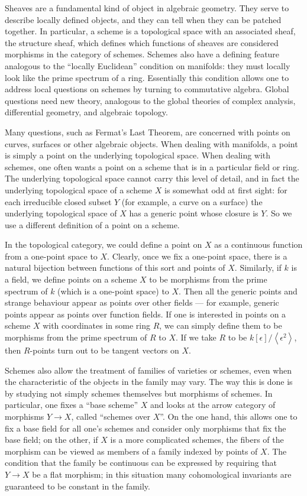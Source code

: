 \documentclass[12pt]{article}
\begin{document}
Sheaves are a fundamental kind of object in algebraic geometry.  They serve to describe locally defined objects, and they can tell when they can be patched together.  In particular, a scheme is a topological space with an associated sheaf, the structure sheaf, which defines which functions of sheaves are considered morphisms in the category of schemes.  Schemes also have a defining feature analogous to the ``locally Euclidean'' condition on manifolds: they must locally look like the prime spectrum of a ring.  Essentially this condition allows one to address local questions on schemes by turning to commutative algebra.  Global questions need new theory, analogous to the global theories of complex analysis, differential geometry, and algebraic topology.

Many questions, such as Fermat's Last Theorem, are concerned with points on curves, surfaces or other algebraic objects.  When dealing with manifolds, a point is simply a point on the underlying topological space.  When dealing with schemes, one often wants a point on a scheme that is in a particular field or ring.  The underlying topological space cannot carry this level of detail, and in fact the underlying topological space of a scheme $X$ is somewhat odd at first sight: for each irreducible closed subset $Y$ (for example, a curve on a surface) the underlying topological space of $X$ has a generic point whose closure is $Y$.  So we use a different definition of a point on a scheme.  

In the topological category, we could define a point on $X$ as a continuous function from a one-point space to $X$.  Clearly, once we fix a one-point space, there is a natural bijection between functions of this sort and points of $X$.  Similarly, if $k$ is a field, we define points on a scheme $X$ to be morphisms from the prime spectrum of $k$ (which is a one-point space) to $X$.  Then all the generic points and strange behaviour appear as points over other fields --- for example, generic points appear as points over function fields.  If one is interested in points on a scheme $X$ with coordinates in some ring $R$, we can simply define them to be morphisms from the prime spectrum of $R$ to $X$.  If we take $R$ to be $k[\epsilon]/\left<\epsilon^2\right>$, then $R$-points turn out to be tangent vectors on $X$.

Schemes also allow the treatment of families of varieties or schemes, even when the characteristic of the objects in the family may vary.  The way this is done is by studying not simply schemes themselves but morphisms of schemes.  In particular, one fixes a ``base scheme'' $X$ and looks at the arrow category of morphisms $Y\to X$, called ``schemes over $X$''.  On the one hand, this allows one to fix a base field for all one's schemes and consider only morphisms that fix the base field; on the other, if $X$ is a more complicated schemes, the fibers of the morphism can be viewed as members of a family indexed by points of $X$.  The condition that the family be continuous can be expressed by requiring that $Y\to X$ be a flat morphism; in this situation many cohomological invariants are guaranteed to be constant in the family. 
\end{document}
